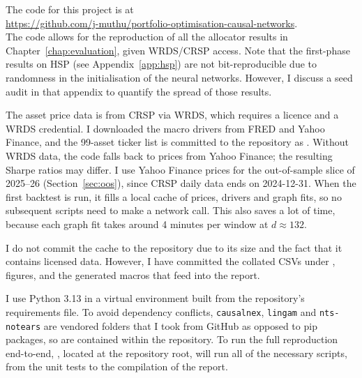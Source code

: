 \documentclass[11pt, a4paper]{report}
\begin{document}
The code for this project is at\\
\url{https://github.com/j-muthu/portfolio-optimisation-causal-networks}.\\
The code allows for the reproduction of all
the allocator results in Chapter~\ref{chap:evaluation}, given WRDS/CRSP access.
Note that the first-phase results on HSP (see Appendix~\ref{app:hsp}) are not
bit-reproducible due to randomness in the initialisation of the neural networks. However, I discuss a seed audit in that appendix to quantify the spread of those results.

The asset price data is from CRSP via WRDS, which requires a licence and a
WRDS credential. I downloaded the macro drivers from FRED and Yahoo Finance, and the 99-asset ticker list is committed to the repository as .
Without WRDS data, the code falls back to prices from Yahoo Finance; the resulting Sharpe ratios may differ.
I use Yahoo Finance prices for the out-of-sample slice of 2025--26 (Section~\ref{sec:oos}), since CRSP daily data ends on 2024-12-31.
When the first backtest is run, it fills a local cache of prices, drivers and graph fits, so no subsequent scripts need to make a network call. This also saves a lot of time, because each graph fit takes around 4 minutes per window at $d\approx132$.

I do not commit the cache to the repository due to its size and the fact that it contains licensed data.
However, I have committed the collated CSVs under , figures, and the generated macros that feed into the report.

I use Python 3.13 in a virtual environment built from the
repository's requirements file. To avoid dependency conflicts, \texttt{causalnex}, \texttt{lingam} and \texttt{nts-notears}
are vendored folders that I took from GitHub as opposed to pip packages, so are contained within the repository.
To run the full reproduction end-to-end, , located at the repository root, will run all of the necessary scripts, from the unit tests to the compilation of the report.
\end{document}
